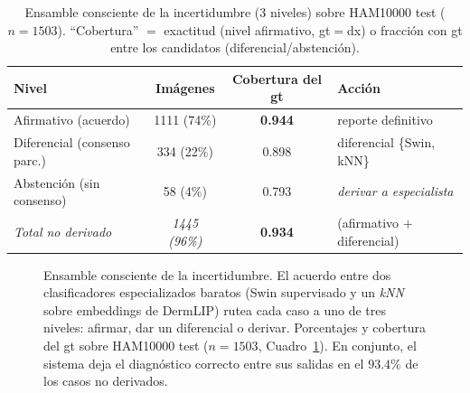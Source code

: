 \documentclass[11pt, a4paper]{article}
\begin{document}
\begin{table}[H]
  \centering
  \caption{Ensamble consciente de la incertidumbre (3 niveles) sobre HAM10000 test ($n=1503$). ``Cobertura''
  $=$ exactitud (nivel afirmativo, gt$=$dx) o fracción con gt entre los candidatos (diferencial/abstención).}
  \label{tab:incertidumbre}
  \begin{tabular}{lccl}
    \toprule
    \textbf{Nivel} & \textbf{Imágenes} & \textbf{Cobertura del gt} & \textbf{Acción} \\
    \midrule
    Afirmativo (acuerdo)        & 1111 (74\%) & \textbf{0.944} & reporte definitivo \\
    Diferencial (consenso parc.) & 334 (22\%)  & 0.898 & diferencial \{Swin, kNN\} \\
    Abstención (sin consenso)   & 58 (4\%)    & 0.793 & \emph{derivar a especialista} \\
    \midrule
    \textit{Total no derivado}  & \textit{1445 (96\%)} & \textbf{0.934} & (afirmativo $+$ diferencial) \\
    \bottomrule
  \end{tabular}
\end{table}

\begin{figure}[htbp]
\centering
{}
\caption{Ensamble consciente de la incertidumbre. El acuerdo entre dos clasificadores especializados
baratos (Swin supervisado y un \emph{kNN} sobre embeddings de DermLIP) rutea cada caso a uno de tres
niveles: afirmar, dar un diferencial o derivar. Porcentajes y cobertura del gt sobre HAM10000 test
($n=1503$, Cuadro~\ref{tab:incertidumbre}). En conjunto, el sistema deja el diagnóstico correcto entre
sus salidas en el $93.4\%$ de los casos no derivados.}
\label{fig:incertidumbre}
\end{figure}
\end{document}
